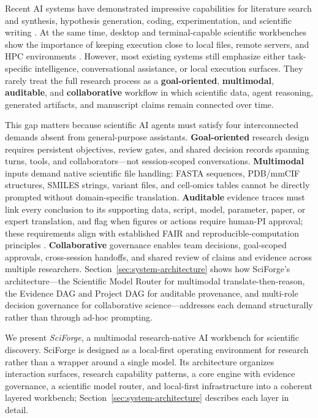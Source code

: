 \documentclass[sn-basic,Numbered,pdflatex]{sn-jnl}
\begin{document}
Recent AI systems have demonstrated impressive capabilities for literature search and synthesis, hypothesis generation, coding, experimentation, and scientific writing \cite{paperQA2024,openScholar2024,googleCoScientist2025,sakanaAIScientist2024,yamada2025aiscientistv2,agentLaboratory2025,ghareeb2026robin,huang2025biomni}. At the same time, desktop and terminal-capable scientific workbenches show the importance of keeping execution close to local files, remote servers, and HPC environments \cite{anthropicClaudeScience2026,omicOSOverview2026,omicsClaw2026,operonGitHub2026,claudePrism2026}. However, most existing systems still emphasize either task-specific intelligence, conversational assistance, or local execution surfaces. They rarely treat the full research process as a \textbf{goal-oriented}, \textbf{multimodal}, \textbf{auditable}, and \textbf{collaborative} workflow in which scientific data, agent reasoning, generated artifacts, and manuscript claims remain connected over time.

This gap matters because scientific AI agents must satisfy four interconnected demands absent from general-purpose assistants. \textbf{Goal-oriented} research design requires persistent objectives, review gates, and shared decision records spanning turns, tools, and collaborators---not session-scoped conversations. \textbf{Multimodal} inputs demand native scientific file handling: FASTA sequences, PDB/mmCIF structures, SMILES strings, variant files, and cell-omics tables cannot be directly prompted without domain-specific translation. \textbf{Auditable} evidence traces must link every conclusion to its supporting data, script, model, parameter, paper, or expert translation, and flag when figures or actions require human-PI approval; these requirements align with established FAIR and reproducible-computation principles \cite{wilkinson2016fair,sandve2013reproducible}. \textbf{Collaborative} governance enables team decisions, goal-scoped approvals, cross-session handoffs, and shared review of claims and evidence across multiple researchers. Section~\ref{sec:system-architecture} shows how SciForge's architecture---the Scientific Model Router for multimodal translate-then-reason, the Evidence DAG and Project DAG for auditable provenance, and multi-role decision governance for collaborative science---addresses each demand structurally rather than through ad-hoc prompting.

We present \emph{SciForge}, a multimodal research-native AI workbench for scientific discovery. SciForge is designed as a local-first operating environment for research rather than a wrapper around a single model. Its architecture organizes interaction surfaces, research capability patterns, a core engine with evidence governance, a scientific model router, and local-first infrastructure into a coherent layered workbench; Section~\ref{sec:system-architecture} describes each layer in detail.
\end{document}
